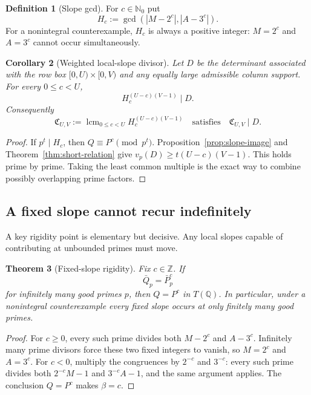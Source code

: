 \documentclass[11pt]{article}
\newtheorem{theorem}{Theorem}[section]
\newtheorem{corollary}[theorem]{Corollary}
\theoremstyle{definition}
\newtheorem{definition}[theorem]{Definition}
\theoremstyle{remark}
\newcommand{\Z}{\mathbb Z}
\newcommand{\Q}{\mathbb Q}
\newcommand{\Nzero}{\mathbb N_0}
\newcommand{\lcm}{\operatorname{lcm}}
\begin{document}
\begin{definition}[Slope gcd]
For $c\in\Nzero$ put
\[
 H_c:=\gcd(|M-2^c|,|A-3^c|).
\]
For a nonintegral counterexample, $H_c$ is always a positive integer: $M=2^c$ and $A=3^c$ cannot occur simultaneously.
\end{definition}

\begin{corollary}[Weighted local-slope divisor]
\label{cor:slope-divisor}
Let $D$ be the determinant associated with the row box $[0,U)\times[0,V)$ and any equally large admissible column support.  For every $0\le c<U$,
\[
 H_c^{(U-c)(V-1)}\mid D.
\]
Consequently
\begin{equation}
 \mathfrak C_{U,V}
 :=\lcm_{0\le c<U} H_c^{(U-c)(V-1)}
 \quad\text{satisfies}\quad
 \mathfrak C_{U,V}\mid D.
 \label{eq:slope-lcm}
\end{equation}
\end{corollary}

\begin{proof}
If $p^t\mid H_c$, then $Q\equiv P^c\pmod {p^t}$.  Proposition~\ref{prop:slope-image} and Theorem~\ref{thm:short-relation} give
$v_p(D)\ge t(U-c)(V-1)$.  This holds prime by prime.  Taking the least common multiple is the exact way to combine possibly overlapping prime factors.
\end{proof}

\subsection{A fixed slope cannot recur indefinitely}

A key rigidity point is elementary but decisive.  Any local slopes capable of contributing at unbounded primes must move.

\begin{theorem}[Fixed-slope rigidity]
\label{thm:fixed-slope}
Fix $c\in\Z$.  If
\[
 \bar Q_p=\bar P_p^c
\]
for infinitely many good primes $p$, then $Q=P^c$ in $T(\Q)$.  In particular, under a nonintegral counterexample every fixed slope occurs at only finitely many good primes.
\end{theorem}

\begin{proof}
For $c\ge0$, every such prime divides both $M-2^c$ and $A-3^c$.  Infinitely many prime divisors force these two fixed integers to vanish, so $M=2^c$ and $A=3^c$.  For $c<0$, multiply the congruences by $2^{-c}$ and $3^{-c}$: every such prime divides both $2^{-c}M-1$ and $3^{-c}A-1$, and the same argument applies.  The conclusion $Q=P^c$ makes $\beta=c$.
\end{proof}
\end{document}
